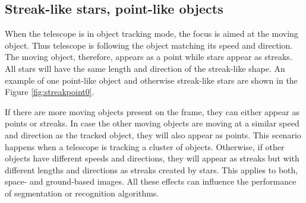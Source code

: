 \subsection{Streak-like stars, point-like objects}
When the telescope is in object tracking mode, the focus is aimed at the moving object. Thus telescope is following the object matching its speed and direction. The moving object, therefore, appears as a point while stars appear as streaks. All stars will have the same length and direction of the streak-like shape. An example of one point-like object and otherwise streak-like stars are shown in the Figure \ref{fig:streakpoint0}. 

If there are more moving objects present on the frame, they can either appear as points or streaks. In case the other moving objects are moving at a similar speed and direction as the tracked object, they will also appear as points. This scenario happens when a telescope is tracking a cluster of objects. Otherwise, if other objects have different speeds and directions, they will appear as streaks but with different lengths and directions as streaks created by stars. 
This applies to both, space- and ground-based images. All these effects can influence the performance of segmentation or recognition algorithms.

